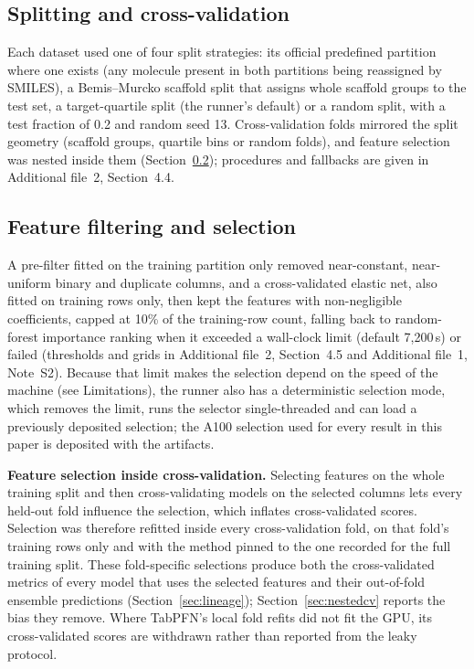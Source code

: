 \subsection{Splitting and cross-validation}\label{sec:splitting}

Each dataset used one of four split strategies: its official predefined partition where one exists (any molecule present in both partitions being reassigned by SMILES), a Bemis--Murcko scaffold split \cite{bemis1996properties} that assigns whole scaffold groups to the test set, a target-quartile split (the runner's default) or a random split, with a test fraction of 0.2 and random seed 13. Cross-validation folds mirrored the split geometry (scaffold groups, quartile bins or random folds), and feature selection was nested inside them (Section~\ref{sec:selection}); procedures and fallbacks are given in Additional file~2, Section~4.4.

\subsection{Feature filtering and selection}\label{sec:selection}

A pre-filter fitted on the training partition only removed near-constant, near-uniform binary and duplicate columns, and a cross-validated elastic net, also fitted on training rows only, then kept the features with non-negligible coefficients, capped at 10\% of the training-row count, falling back to random-forest importance ranking when it exceeded a wall-clock limit (default 7,200\,s) or failed (thresholds and grids in Additional file~2, Section~4.5 and Additional file~1, Note~S2). Because that limit makes the selection depend on the speed of the machine (see Limitations), the runner also has a deterministic selection mode, which removes the limit, runs the selector single-threaded and can load a previously deposited selection; the A100 selection used for every result in this paper is deposited with the artifacts.

\textbf{Feature selection inside cross-validation.} Selecting features on the whole training split and then cross-validating models on the selected columns lets every held-out fold influence the selection, which inflates cross-validated scores. Selection was therefore refitted inside every cross-validation fold, on that fold's training rows only and with the method pinned to the one recorded for the full training split. These fold-specific selections produce both the cross-validated metrics of every model that uses the selected features and their out-of-fold ensemble predictions (Section~\ref{sec:lineage}); Section~\ref{sec:nestedcv} reports the bias they remove. Where TabPFN's local fold refits did not fit the GPU, its cross-validated scores are withdrawn rather than reported from the leaky protocol.

